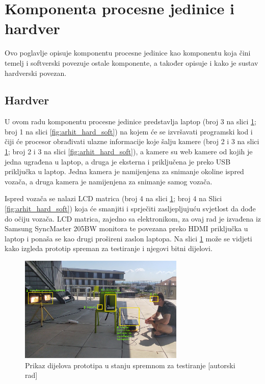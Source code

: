 \documentclass{foi}
\begin{document}
\newpage
\section{Komponenta procesne jedinice i hardver}

Ovo poglavlje opisuje komponentu procesne jedinice kao komponentu koja čini temelj i softverski povezuje ostale komponente, a također opisuje i kako je sustav hardverski povezan.

\subsection{Hardver}
U ovom radu komponentu procesne jedinice predstavlja laptop (broj 3 na slici \ref{fig:prototip_dijelovi}; broj 1 na slici \ref{fig:arhit_hard_soft}) na kojem će se izvršavati programski kod i čiji će procesor obrađivati ulazne informacije koje šalju kamere (broj 2 i 3 na slici \ref{fig:prototip_dijelovi}; broj 2 i 3 na slici \ref{fig:arhit_hard_soft}), a kamere su web kamere od kojih je jedna ugrađena u laptop, a druga je eksterna i priključena je preko USB priključka u laptop. Jedna kamera je namijenjena za snimanje okoline ispred vozača, a druga kamera je namijenjena za snimanje samog vozača.

Ispred vozača se nalazi LCD matrica (broj 4 na slici \ref{fig:prototip_dijelovi}; broj 4 na Slici \ref{fig:arhit_hard_soft}) koja će smanjiti i sprječiti zasljepljujuću svjetlost da dođe do očiju vozača. LCD matrica, zajedno sa elektronikom, za ovaj rad je izvađena iz Samsung SyncMaster 205BW monitora te povezana preko HDMI priključka u laptop i ponaša se kao drugi prošireni zaslon laptopa. Na slici \ref{fig:prototip_dijelovi} može se vidjeti kako izgleda prototip spreman za testiranje i njegovi bitni dijelovi.

\begin{figure}[h!]
    \centering
    \includegraphics[width=0.7\textwidth]{slike/prototip_dijelovi}
    \caption{Prikaz dijelova prototipa u stanju spremnom za testiranje [autorski rad]}
    \label{fig:prototip_dijelovi}
\end{figure}
\end{document}
